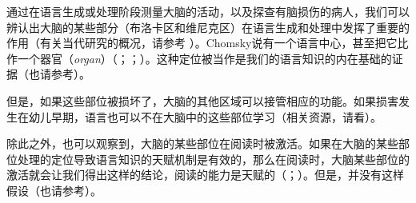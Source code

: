 通过在语言生成或处理阶段测量大脑的活动，以及探查有脑损伤的病人，我们可以辨认出大脑的某些部分（布洛卡区和维尼克区）在语言生成和处理中发挥了重要的作用（有关当代研究的概况，请参考 ）。Chomsky说有一个语言中心，甚至把它比作一个器官（\emph{organ}）（\citealp[]{Chomsky77c-u}；\citealp[]{Chomsky2005a}；\citealp[]{Chomsky2008a}）。这种定位被当作是我们的语言知识的内在基础的证据（也请参考\citealp[--314]{Pinker94a}）。

但是，如果这些部位被损坏了，大脑的其他区域可以接管相应的功能。如果损害发生在幼儿早期，语言也可以不在大脑中的这些部位学习（相关资源，请看\citealp[\S~4.1]{Dabrowska2004a}）。

除此之外，也可以观察到，大脑的某些部位在阅读时被激活。如果在大脑的某些部位处理的定位导致语言知识的天赋机制是有效的，那么在阅读时，大脑某些部位的激活就会让我们得出这样的结论，阅读的能力是天赋的（\citealp[\page ]{EBJKSPP96a}；\citealp[]{Bishop2002a}）。但是，并没有这样假设（也请参考\citealp*[]{FHC2005a}）。

